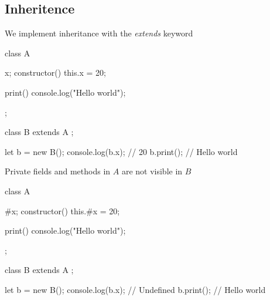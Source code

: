 \documentclass{report}
\begin{document}
    \subsection{Inheritence}
    \bigbreak \noindent 
    We implement inheritance with the \textit{extends} keyword
    \bigbreak \noindent 
    \begin{jscode}
        class A {
            x;
            constructor() {
                this.x = 20;
            }

            print() {
                console.log("Hello world");
            }
        };

        class B extends A {
        };

        let b = new B();
        console.log(b.x); // 20
        b.print(); // Hello world
    \end{jscode}
    \bigbreak \noindent 
    Private fields and methods in $A$ are not visible in $B$
    \bigbreak \noindent 
    \begin{jscode}
        class A {
            #x;
            constructor() {
                this.#x = 20;
            }

            print() {
                console.log("Hello world");
            }
        };

        class B extends A {
        };

        let b = new B();
        console.log(b.x); // Undefined
        b.print(); // Hello world
    \end{jscode}

    \bigbreak \noindent 
\end{document}
